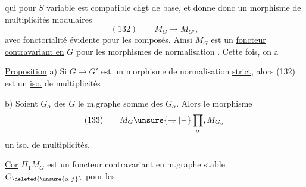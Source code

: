 qui pour $S$ variable est compatible  chgt de base, et donne donc un morphisme de multiplicités modulaires 
\[
(132)\qquad M_G\longrightarrow M_{G'},
\]
avec fonctorialité évidente pour les composés. Ainsi $M_G$ est un \uline{foncteur contravariant en} $G$ pour les morphismes de normalisation . Cette fois, on a

\uline{Proposition} a) Si $G\longrightarrow G'$ est un morphisme de normalisation \uline{strict}, alors (132) est un \uline{iso.} de multiplicités

b) Soient $G_\alpha$ des   $G$ le m.graphe somme des $G_\alpha$. Alors\unsure{:|,} le morphisme
\[
(133)\qquad M_G\unsure{\rightharpoondown|{-}}\prod_\alpha, M_{G_\alpha}
\]
 un iso. de multiplicités.

\uline{Cor} $\Pi_1M_G$ est un foncteur contravariant en  m.graphe stable $G_{\deleted{\unsure{\alpha|f}}}$ pour les
